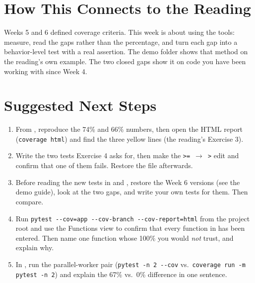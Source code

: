 \documentclass[11pt]{article}
\begin{document}
\section{How This Connects to the Reading}
\begin{keyidea}
Weeks 5 and 6 defined coverage criteria. This week is about using the
tools: measure, read the gaps rather than the percentage, and turn each
gap into a behavior-level test with a real assertion. The demo folder
shows that method on the reading's own example. The two closed gaps
show it on code you have been working with since Week 4.
\end{keyidea}

\section{Suggested Next Steps}
\begin{enumerate}
\item From , reproduce the 74\% and 66\%
numbers, then open the HTML report (\texttt{coverage html}) and find
the three yellow lines (the reading's Exercise 3).
\item Write the two tests Exercise 4 asks for, then make the
\texttt{>=}~$\rightarrow$~\texttt{>} edit and confirm that one of them
fails. Restore the file afterwards.
\item Before reading the new tests in  and
, restore the Week 6 versions (see the demo
guide), look at the two gaps, and write your own tests for them. Then
compare.
\item Run \texttt{pytest -{}-cov=app -{}-cov-branch -{}-cov-report=html}
from the project root and use the Functions view to confirm that every
function in  has been entered. Then name one function whose
100\% you would \emph{not} trust, and explain why.
\item In , run the parallel-worker
pair (\texttt{pytest -n 2 -{}-cov} vs.\ \texttt{coverage run -m pytest
-n 2}) and explain the 67\% vs.\ 0\% difference in one sentence.
\end{enumerate}
\end{document}
